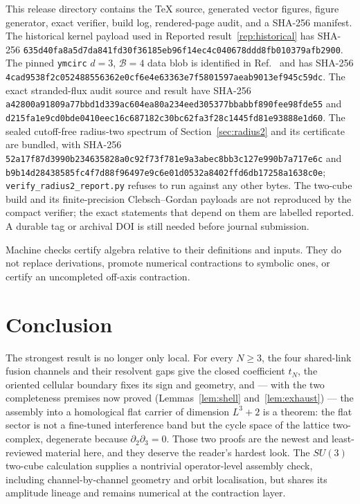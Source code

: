 \documentclass[11pt]{article}
\theoremstyle{plain}
\theoremstyle{definition}
\theoremstyle{remark}
\begin{document}
This release directory contains the TeX source, generated vector figures,
figure generator, exact verifier, build log, rendered-page audit, and a
SHA-256 manifest. The historical kernel payload used in
Reported result~\ref{rep:historical} has SHA-256
\nolinkurl{635d40fa8a5d7da841fd30f36185eb96f14ec4c040678ddd8fb010379afb2900}.
The pinned \texttt{ymcirc} $d=3$, $\mathcal B=4$ data blob is identified in
Ref.~\cite{ymcirc2026} and has SHA-256
\nolinkurl{4cad9538f2c052488556362e0cf6e4e63363e7f5801597aeab9013ef945c59dc}.
The exact stranded-flux audit source and result have SHA-256
\nolinkurl{a42800a91809a77bbd1d339ac604ea80a234eed305377bbabbf890fee98fde55}
and
\nolinkurl{d215fa1e9cd0bde0410eec16c687182c30bc62fa3f28c1445fd81e93888e1d60}.
The sealed cutoff-free radius-two spectrum of Section~\ref{sec:radius2} and
its certificate are bundled, with SHA-256
\nolinkurl{52a17f87d3990b234635828a0c92f73f781e9a3abec8bb3c127e990b7a717e6c}
and
\nolinkurl{b9b14d28438585fc4f7d88f96497e9c6e01d0532a8402ffd6db17258a1638c0e};
\texttt{verify\_radius2\_report.py} refuses to run against any other bytes.
The two-cube build and its finite-precision Clebsch--Gordan payloads are not
reproduced by the compact verifier; the exact statements that depend on them
are labelled reported. A durable tag or archival DOI is still needed before
journal submission.

Machine checks certify algebra relative to their definitions and inputs. They
do not replace derivations, promote numerical contractions to symbolic ones,
or certify an uncompleted off-axis contraction.

\section{Conclusion}

The strongest result is no longer only local. For every $N\ge3$, the four
shared-link fusion channels and their resolvent gaps give the closed
coefficient $t_N$, the oriented cellular boundary fixes its sign and
geometry, and --- with the two completeness premises now proved
(Lemmas~\ref{lem:shell} and~\ref{lem:exhaust}) --- the assembly into a
homological flat carrier of dimension $L^3+2$ is a theorem: the flat sector
is not a fine-tuned interference band but the cycle space of the lattice
two-complex, degenerate because $\partial_2\partial_3=0$. Those two proofs
are the newest and least-reviewed material here, and they deserve the
reader's hardest look. The $SU(3)$ two-cube calculation supplies a
nontrivial operator-level assembly check, including channel-by-channel
geometry and orbit localisation, but shares its amplitude lineage and remains
numerical at the contraction layer.
\end{document}

